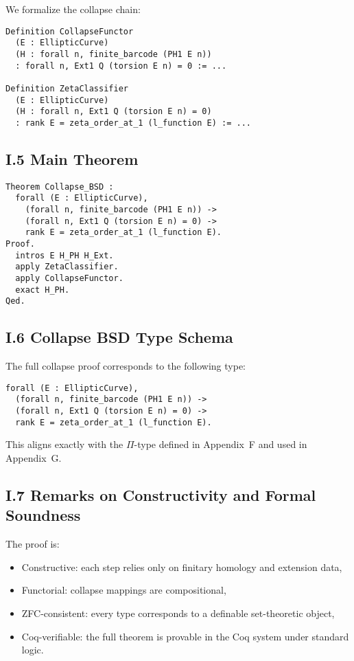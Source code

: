 \documentclass[11pt]{article}
\begin{document}
We formalize the collapse chain:

\begin{lstlisting}
Definition CollapseFunctor
  (E : EllipticCurve)
  (H : forall n, finite_barcode (PH1 E n))
  : forall n, Ext1 Q (torsion E n) = 0 := ...

Definition ZetaClassifier
  (E : EllipticCurve)
  (H : forall n, Ext1 Q (torsion E n) = 0)
  : rank E = zeta_order_at_1 (l_function E) := ...
\end{lstlisting}

\subsection*{I.5 Main Theorem}

\begin{lstlisting}
Theorem Collapse_BSD :
  forall (E : EllipticCurve),
    (forall n, finite_barcode (PH1 E n)) ->
    (forall n, Ext1 Q (torsion E n) = 0) ->
    rank E = zeta_order_at_1 (l_function E).
Proof.
  intros E H_PH H_Ext.
  apply ZetaClassifier.
  apply CollapseFunctor.
  exact H_PH.
Qed.
\end{lstlisting}

\subsection*{I.6 Collapse BSD Type Schema}

The full collapse proof corresponds to the following type:

\begin{lstlisting}
forall (E : EllipticCurve),
  (forall n, finite_barcode (PH1 E n)) ->
  (forall n, Ext1 Q (torsion E n) = 0) ->
  rank E = zeta_order_at_1 (l_function E).
\end{lstlisting}

This aligns exactly with the $\Pi$-type defined in Appendix~F and used in Appendix~G.

\subsection*{I.7 Remarks on Constructivity and Formal Soundness}

The proof is:
\begin{itemize}
  \item Constructive: each step relies only on finitary homology and extension data,
  \item Functorial: collapse mappings are compositional,
  \item ZFC-consistent: every type corresponds to a definable set-theoretic object,
  \item Coq-verifiable: the full theorem is provable in the Coq system under standard logic.
\end{itemize}
\end{document}
